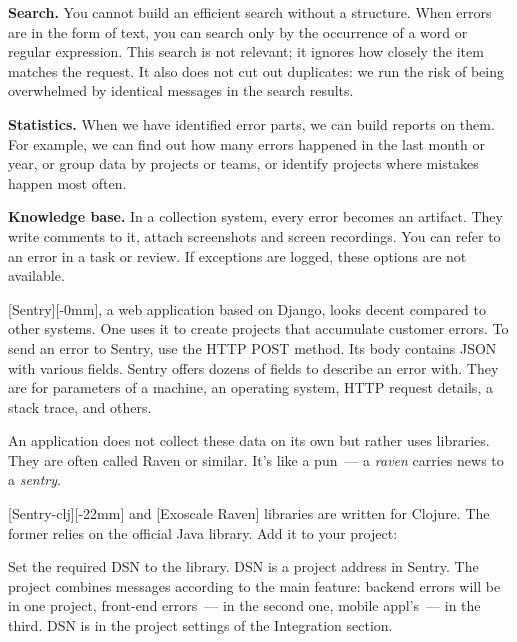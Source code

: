 \textbf{Search.} You cannot build an efficient search without a structure.
When errors are in the form of text, you can search only by the occurrence of a word or regular expression. This search is not relevant; it ignores how closely the item matches the request. It also does not cut out duplicates: we run the risk of being overwhelmed by identical messages in the search results.

\textbf{Statistics.} When we have identified error parts, we can build reports on them. For example, we can find out how many errors happened in the last month or year, or group data by projects or teams, or identify projects where mistakes happen most often.

\textbf{Knowledge base.} In a collection system, every error becomes an artifact. They write comments to it, attach screenshots and screen recordings. You can refer to an error in a task or review. If exceptions are logged, these options are not available.


[Sentry][-0mm], a web application based on Django, looks decent compared to other systems. One uses it to create projects that accumulate customer errors. To send an error to Sentry, use the HTTP POST method. Its body contains JSON with various fields. Sentry offers dozens of fields to describe an error with. They are for parameters of a machine, an operating system, HTTP request details, a stack trace, and others.


An application does not collect these data on its own but rather uses libraries. They are often called Raven or similar. It's like a pun~--- a \emph{raven} carries news to a \emph{sentry}.

[Sentry-clj][-22mm] and [Exoscale Raven] libraries are written for Clojure. The former relies on the official Java library. Add it to your project:

\begin{clojure}
\end{clojure}


Set the required DSN to the library. DSN is a project address in Sentry. The project combines messages according to the main feature: backend errors will be in one project, front-end errors~--- in the second one, mobile appl's~--- in the third. DSN is in the project settings of the Integration section.

